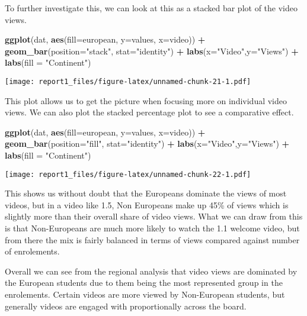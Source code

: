 \documentclass[
]{article}
\newenvironment{Shaded}{\begin{snugshade}}{\end{snugshade}}
\newcommand{\DataTypeTok}[1]{\textcolor[rgb]{0.13,0.29,0.53}{#1}}
\newcommand{\KeywordTok}[1]{\textcolor[rgb]{0.13,0.29,0.53}{\textbf{#1}}}
\newcommand{\NormalTok}[1]{#1}
\newcommand{\OperatorTok}[1]{\textcolor[rgb]{0.81,0.36,0.00}{\textbf{#1}}}
\newcommand{\StringTok}[1]{\textcolor[rgb]{0.31,0.60,0.02}{#1}}
\begin{document}
To further investigate this, we can look at this as a stacked bar plot
of the video views.

\begin{Shaded}
\begin{Highlighting}[]
\KeywordTok{ggplot}\NormalTok{(dat, }\KeywordTok{aes}\NormalTok{(}\DataTypeTok{fill=}\NormalTok{european, }\DataTypeTok{y=}\NormalTok{values, }\DataTypeTok{x=}\NormalTok{video)) }\OperatorTok{+}\StringTok{ }
\StringTok{  }\KeywordTok{geom_bar}\NormalTok{(}\DataTypeTok{position=}\StringTok{"stack"}\NormalTok{, }\DataTypeTok{stat=}\StringTok{"identity"}\NormalTok{) }\OperatorTok{+}\StringTok{ }\KeywordTok{labs}\NormalTok{(}\DataTypeTok{x=}\StringTok{"Video"}\NormalTok{,}\DataTypeTok{y=}\StringTok{"Views"}\NormalTok{) }\OperatorTok{+}\StringTok{ }
\StringTok{  }\KeywordTok{labs}\NormalTok{(}\DataTypeTok{fill =} \StringTok{"Continent"}\NormalTok{)}
\end{Highlighting}
\end{Shaded}

\texttt{[image: report1\_files/figure-latex/unnamed-chunk-21-1.pdf]}

This plot allows us to get the picture when focusing more on individual
video views. We can also plot the stacked percentage plot to see a
comparative effect.

\begin{Shaded}
\begin{Highlighting}[]
\KeywordTok{ggplot}\NormalTok{(dat, }\KeywordTok{aes}\NormalTok{(}\DataTypeTok{fill=}\NormalTok{european, }\DataTypeTok{y=}\NormalTok{values, }\DataTypeTok{x=}\NormalTok{video)) }\OperatorTok{+}\StringTok{ }
\StringTok{  }\KeywordTok{geom_bar}\NormalTok{(}\DataTypeTok{position=}\StringTok{"fill"}\NormalTok{, }\DataTypeTok{stat=}\StringTok{"identity"}\NormalTok{) }\OperatorTok{+}\StringTok{ }\KeywordTok{labs}\NormalTok{(}\DataTypeTok{x=}\StringTok{"Video"}\NormalTok{,}\DataTypeTok{y=}\StringTok{"Views"}\NormalTok{) }\OperatorTok{+}\StringTok{ }
\StringTok{  }\KeywordTok{labs}\NormalTok{(}\DataTypeTok{fill =} \StringTok{"Continent"}\NormalTok{)}
\end{Highlighting}
\end{Shaded}

\texttt{[image: report1\_files/figure-latex/unnamed-chunk-22-1.pdf]}

This shows us without doubt that the Europeans dominate the views of
most videos, but in a video like 1.5, Non Europeans make up 45\% of
views which is slightly more than their overall share of video views.
What we can draw from this is that Non-Europeans are much more likely to
watch the 1.1 welcome video, but from there the mix is fairly balanced
in terms of views compared against number of enrolements.

Overall we can see from the regional analysis that video views are
dominated by the European students due to them being the most
represented group in the enrolements. Certain videos are more viewed by
Non-European students, but generally videos are engaged with
proportionally across the board.
\end{document}
